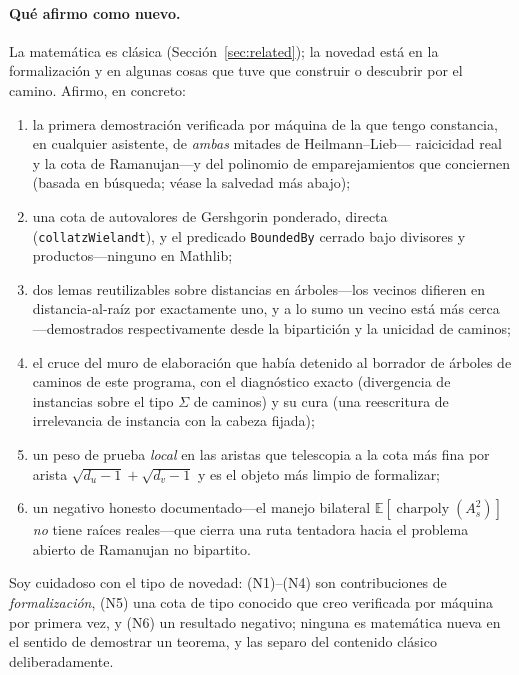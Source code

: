 \documentclass[11pt]{article}
\newcommand{\lean}[1]{{\def\_{\textunderscore\allowbreak}\texttt{#1}}}
\begin{document}
\paragraph{Qu\'e afirmo como nuevo.} La matem\'atica es cl\'asica
(Secci\'on~\ref{sec:related}); la novedad est\'a en la formalizaci\'on y en algunas
cosas que tuve que construir o descubrir por el camino. Afirmo, en concreto:
\begin{enumerate}\itemsep1.5pt
\item[(N1)] la primera demostraci\'on verificada por m\'aquina de la que tengo
  constancia, en cualquier asistente, de \emph{ambas} mitades de Heilmann--Lieb---%
  raicicidad real y la cota de Ramanujan---y del polinomio de emparejamientos que
  conciernen (basada en b\'usqueda; v\'ease la salvedad m\'as abajo);
\item[(N2)] una cota de autovalores de Gershgorin ponderado, directa
  (\lean{collatzWielandt}), y el predicado \lean{BoundedBy} cerrado bajo divisores y
  productos---ninguno en Mathlib;
\item[(N3)] dos lemas reutilizables sobre distancias en \'arboles---los vecinos
  difieren en distancia-al-raíz por exactamente uno, y a lo sumo un vecino est\'a
  m\'as cerca---demostrados respectivamente desde la bipartici\'on y la unicidad de
  caminos;
\item[(N4)] el cruce del muro de elaboraci\'on que hab\'ia detenido al borrador de
  \'arboles de caminos de este programa, con el diagn\'ostico exacto (divergencia de
  instancias sobre el tipo $\Sigma$ de caminos) y su cura (una reescritura de
  irrelevancia de instancia con la cabeza fijada);
\item[(N5)] un peso de prueba \emph{local} en las aristas que telescopia a la cota
  m\'as fina por arista $\sqrt{d_u-1}+\sqrt{d_v-1}$ y es el objeto m\'as limpio de
  formalizar;
\item[(N6)] un negativo honesto documentado---el manejo bilateral
  $\mathbb{E}[\operatorname{charpoly}(A_s^2)]$ \emph{no} tiene ra\'ices reales---que
  cierra una ruta tentadora hacia el problema abierto de Ramanujan no bipartito.
\end{enumerate}
Soy cuidadoso con el tipo de novedad: (N1)--(N4) son contribuciones de
\emph{formalizaci\'on}, (N5) una cota de tipo conocido que creo verificada por
m\'aquina por primera vez, y (N6) un resultado negativo; ninguna es matem\'atica
nueva en el sentido de demostrar un teorema, y las separo del contenido cl\'asico
deliberadamente.
\end{document}

